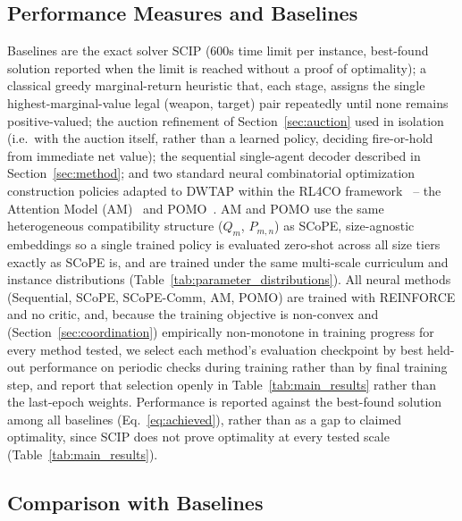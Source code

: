 \subsection{Performance Measures and Baselines}

Baselines are the exact solver SCIP (600s time limit per instance, best-found solution reported when the limit is reached without a proof of optimality); a classical greedy marginal-return heuristic that, each stage, assigns the single highest-marginal-value legal (weapon, target) pair repeatedly until none remains positive-valued; the auction refinement of Section~\ref{sec:auction} used in isolation (i.e.\ with the auction itself, rather than a learned policy, deciding fire-or-hold from immediate net value); the sequential single-agent decoder described in Section~\ref{sec:method}; and two standard neural combinatorial optimization construction policies adapted to DWTAP within the RL4CO framework~\cite{berto2023rl4co} -- the Attention Model (AM)~\cite{kool2018attention} and POMO~\cite{kwon2020pomo}. AM and POMO use the same heterogeneous compatibility structure ($Q_m$, $P_{m,n}$) as SCoPE, size-agnostic embeddings so a single trained policy is evaluated zero-shot across all size tiers exactly as SCoPE is, and are trained under the same multi-scale curriculum and instance distributions (Table~\ref{tab:parameter_distributions}). All neural methods (Sequential, SCoPE, SCoPE-Comm, AM, POMO) are trained with REINFORCE and no critic, and, because the training objective is non-convex and (Section~\ref{sec:coordination}) empirically non-monotone in training progress for every method tested, we select each method's evaluation checkpoint by best held-out performance on periodic checks during training rather than by final training step, and report that selection openly in Table~\ref{tab:main_results} rather than the last-epoch weights. Performance is reported against the best-found solution among all baselines (Eq.~\eqref{eq:achieved}), rather than as a gap to claimed optimality, since SCIP does not prove optimality at every tested scale (Table~\ref{tab:main_results}).

\subsection{Comparison with Baselines}
\label{sec:main-results}

